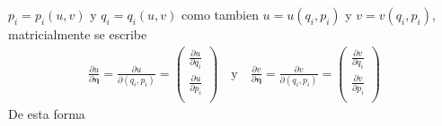 \documentclass[a4paper]{article}
\begin{document}
\begin{answer}[punto 21]
        $p_i = p_i(u,v)$ y $q_i = q_i(u,v)$ como tambien $u = u(q_i, p_i)$ y $v = v(q_i, p_i)$, matricialmente se escribe  
        \begin{align*}
            \frac{\partial u}{\partial \pmb \eta} = \frac {\partial u}{\partial (q_i, p_i)} = \begin{pmatrix}
                \frac{\partial u}{\partial q_i} \\
                \frac{\partial u}{\partial p_i} \\
            \end{pmatrix} \quad \text{y} \quad \frac{\partial v}{\partial \pmb \eta} = \frac {\partial v}{\partial (q_i, p_i)} = \begin{pmatrix}
                \frac{\partial v}{\partial q_i} \\
                \frac{\partial v}{\partial p_i} \\
            \end{pmatrix}
        \end{align*}
        De esta forma


\end{answer}
\end{document}
